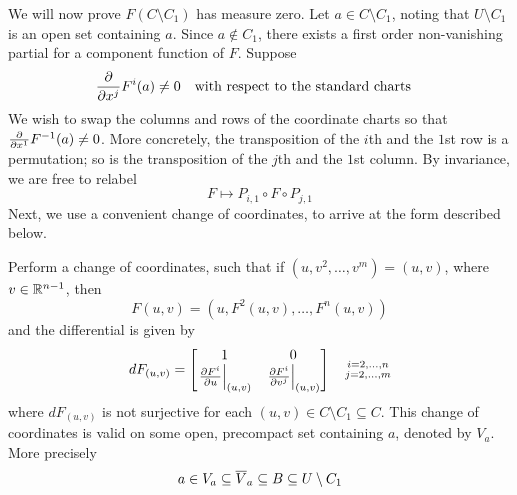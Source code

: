 \documentclass[../main-manifolds.tex]{subfiles}
\begin{document}
We will now prove $F(C\setminus C_1)$ has measure zero. Let $a\in C\setminus C_1$, noting that $U\setminus C_1$ is an open set containing $a$. Since $a\notin C_1$, there exists a first order non-vanishing partial for a component function of $F$. Suppose 
\[
    \pdv{x^j}F^{i}(a)\neq 0\qqtext{with respect to the standard charts}
\]
We wish to swap the columns and rows of the coordinate charts so that $\pdv{x^1}F^{-1}(a)\neq 0$. More concretely, the transposition of the $i$th and the $1$st row is a permutation; so is the transposition of the $j$th and the $1$st column. By invariance, we are free to relabel
\[
    F\mapsto P_{i,1}\circ F\circ P_{j,1}
\]
Next, we use a convenient change of coordinates, to arrive at the form described below.
\begin{step}
    Perform a change of coordinates, such that if $(u,v^2,\ldots,v^m) = (u,v)$, where $v\in\mathbb{R}^{n-1}$, then
    \begin{equation}\label{lee-sards-eq-6.2a}
        F(u,v) = (u,F^2(u,v), \ldots, F^n(u,v))
    \end{equation}
    and the differential is given by
    \begin{equation}\label{lee-sards-eq-6.2b}
        dF_{(u,v)} = \begin{bmatrix}
            1&0\\ \eval{\pdv{F^i}{u}}_{(u,v)} & \eval{\pdv{F^i}{v^j}}_{(u,v)}
        \end{bmatrix}\quad \substack{i=2,\ldots,n\\ j=2,\ldots,m}
    \end{equation}
    where $dF_{(u,v)}$ is not surjective for each $(u,v)\in C\setminus C_1\subseteq C$. This change of coordinates is valid on some open, precompact set containing $a$, denoted by $V_a$. More precisely
    \begin{equation}\label{lee-sards-precompact}
    a\in V_a\subseteq\overline{V}_a\subseteq B\subseteq U\setminus C_1
    \end{equation}
\end{step}
\end{document}

